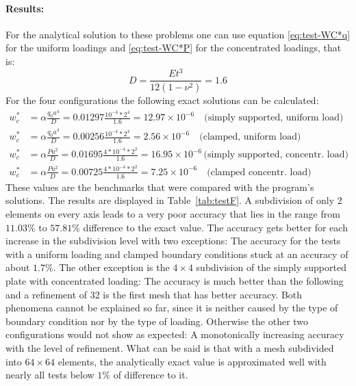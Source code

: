   \paragraph{Results:} For the analytical solution to these problems one can use equation \eqref{eq:test-WC*q} for the uniform loadings and \eqref{eq:test-WC*P} for the concentrated loadings, that is:
   \begin{equation*}
   D = \frac{E t^3}{12 \left( 1 - \nu^2 \right)} = 1.6
   \end{equation*}
   For the four configurations the following exact solutions can be calculated:
   \begin{align*}
   w_c^* &= \alpha \frac{q_0 a^4}{D} = 0.01297 \frac{10^{-4} * 2^4}{1.6} = 12.97\times 10^{-6}\quad \text{(simply supported, uniform load)}\\
   w_c^* &= \alpha \frac{q_0 a^4}{D} = 0.00256 \frac{10^{-4} * 2^4}{1.6} = 2.56\times 10^{-6}\quad \text{(clamped, uniform load)}\\
   w_c^* &= \alpha \frac{P a^2}{D} = 0.01695 \frac{4 * 10^{-4} * 2^2}{1.6} = 16.95\times 10^{-6}\, \text{(simply supported, concentr. load)}\\
   w_c^* &= \alpha \frac{P a^2}{D} = 0.00725 \frac{4 * 10^{-4} * 2^2}{1.6} = 7.25\times 10^{-6}\quad\! \text{(clamped concentr. load)}
   \end{align*}
   These values are the benchmarks that were compared with the program's solutions. The results are displayed in Table~\ref{tab:testF}. A subdivision of only 2 elements on every axis leads to a very poor accuracy that lies in the range from $11.03\%$ to $57.81\%$ difference to the exact value. The accuracy gets better for each increase in the subdivision level with two exceptions: The accuracy for the tests with a uniform loading and clamped boundary conditions stuck at an accuracy of about $1.7\%$. The other exception is the $4\!\times\!4$ subdivision of the simply supported plate with concentrated loading: The accuracy is much better than the following and a refinement of 32 is the first mesh that has better accuracy. Both phenomena cannot be explained so far, since it is neither caused by the type of boundary condition nor by the type of loading. Otherwise the other two configurations would not show as expected: A monotonically increasing accuracy with the level of refinement. What can be said is that with a mesh subdivided into $64\!\times\!64$ elements, the analytically exact value is approximated well with nearly all tests below $1\%$ of difference to it.
    
